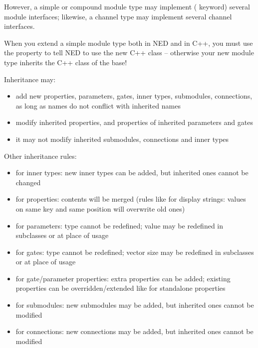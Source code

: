 However, a simple or compound module type may implement (
keyword) several module interfaces; likewise, a channel type may implement
several channel interfaces.

\begin{important}
    When you extend a simple module type both in NED and in C++, you must
    use the  property to tell NED to use the new C++ class --
    otherwise your new module type inherits the C++ class of the base!
\end{important}



Inheritance may:
\begin{itemize}
    \item add new properties, parameters, gates, inner types, submodules,
          connections, as long as names do not conflict with inherited names
    \item modify inherited properties, and properties of inherited parameters and
          gates
    \item it may not modify inherited submodules, connections and inner types
\end{itemize}

Other inheritance rules:
\begin{itemize}
    \item  for inner types:
       new inner types can be added, but inherited ones cannot be changed
    \item  for properties:
       contents will be merged (rules like for display strings: values on
       same key and same position will overwrite old ones)
    \item for parameters:
       type cannot be redefined;
       value may be redefined in subclasses or at place of usage
    \item  for gates:
       type cannot be redefined;
       vector size may be redefined in subclasses or at place of usage
    \item  for gate/parameter properties:
       extra properties can be added;
       existing properties can be overridden/extended like for standalone properties
    \item  for submodules:
       new submodules may be added, but inherited ones cannot be modified
    \item  for connections:
       new connections may be added, but inherited ones cannot be modified
\end{itemize}



